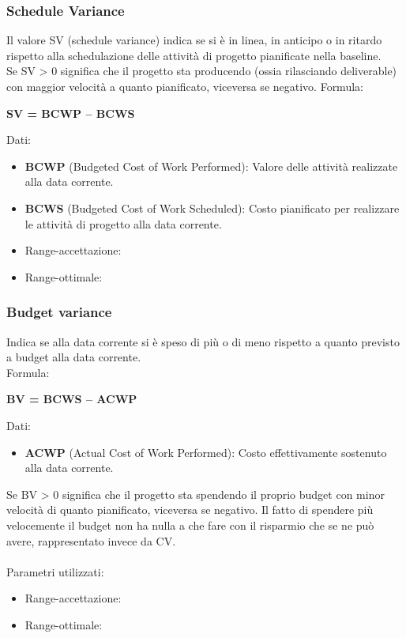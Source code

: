 \documentclass[a4paper,11pt]{article}
\begin{document}
\subsubsection{Schedule Variance}
Il valore SV (schedule variance) indica se si è in linea, in anticipo o in ritardo rispetto alla schedulazione delle attività di progetto pianificate nella baseline.\\
Se SV > 0 significa che il progetto sta producendo (ossia rilasciando deliverable) con maggior velocità a quanto pianificato, viceversa se negativo.
Formula:
\begin{center}
\textbf{SV = BCWP – BCWS\\}
\end{center}
Dati:
\begin{itemize}
\item \textbf{BCWP} (Budgeted Cost of Work Performed): Valore delle attività realizzate alla data corrente.
\item \textbf{BCWS} (Budgeted Cost of Work Scheduled): Costo pianificato per realizzare le attività di progetto alla data corrente.
\end{itemize}
\begin{itemize}
	\item Range-accettazione: \begin{math} [ \ge -(PreventivoFase*5\%)]
	\end{math}
	\item Range-ottimale: \begin{math}[ \ge 0]\end{math}
	\end{itemize}
\subsubsection{Budget variance} Indica se alla data corrente si è speso di più o di meno rispetto a quanto previsto a budget alla data corrente.\\
Formula: 
\begin{center}
\textbf{BV = BCWS – ACWP}
\end{center}
Dati:
\begin{itemize}
\item \textbf{ACWP} (Actual Cost of Work Performed): Costo effettivamente sostenuto alla data corrente.
\end{itemize}
Se BV > 0 significa che il progetto sta spendendo il proprio budget con minor velocità di quanto pianificato, viceversa se negativo. Il fatto di spendere più velocemente il budget non ha nulla a che fare con il risparmio che se ne può avere, rappresentato invece da CV.\\\\
Parametri utilizzati: 
\begin{itemize}
	\item Range-accettazione: \begin{math}[ \ge -(PreventivoFase*10\%)]
	\end{math}
	\item Range-ottimale: \begin{math}[ \ge 0]\end{math}
	\end{itemize}
\end{document}
